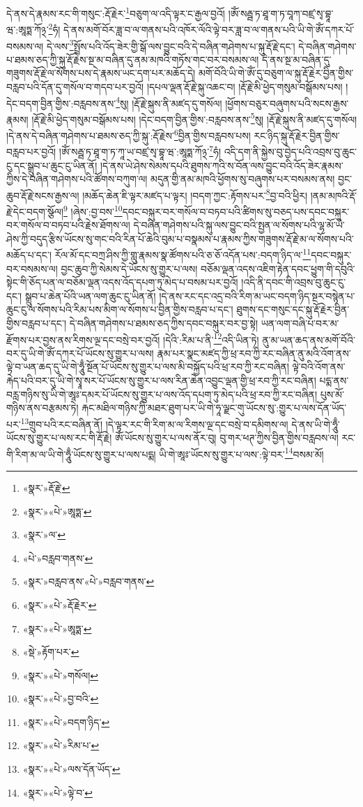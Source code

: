 དེ་ནས་དེ་རྣམས་རང་གི་གསུང་:རྡོ་རྗེར་\footnote{«སྣར་»རྡོ་རྗེ་}བཅུག་ལ་འདི་ལྟར་ང་རྒྱལ་བྱའོ། །ཨོཾ་སརྦྦ་ཏ་ཐཱ་ག་ཏ་བཱཀ་བཛྲ་སྭ་བྷཱ་ཝ་:ཨཱཏྨ་ཀོ྅་\footnote{«སྣར་»«པེ་»ཨཱཏྨ་}ཧཾ། དེ་ནས་མགོ་བོར་ཟླ་བ་ལ་གནས་པའི་འཁོར་ལོའི་ལྟེ་བར་ཟླ་བ་ལ་གནས་པའི་ཡི་གེ་ཨོཾ་དཀར་པོ་བསམས་ལ། དེ་ལས་\footnote{«སྣར་»ལ་}སྤྲོས་པའི་འོད་ཟེར་གྱི་སྒོ་ལས་བྱུང་བའི་དེ་བཞིན་གཤེགས་པ་སྐུ་རྡོ་རྗེ་དང་། དེ་བཞིན་གཤེགས་པ་ཐམས་ཅད་ཀྱི་སྐུ་རྡོ་རྗེས་སྔ་མ་བཞིན་དུ་ནམ་མཁའི་གཏོས་གང་བར་བསམས་ལ། དེ་ནས་སྔ་མ་བཞིན་དུ་གཟུགས་རྡོ་རྗེ་ལ་སོགས་པས་དེ་རྣམས་ཡང་དག་པར་མཆོད་དེ། མགོ་བོའི་ཡི་གེ་ཨོཾ་དུ་བཅུག་ལ་སྐུ་རྡོ་རྗེར་བྱིན་གྱིས་བརླབ་པའི་དོན་དུ་གསོལ་བ་གདབ་པར་བྱའོ། །དཔལ་ལྡན་རྡོ་རྗེ་སྐུ་འཆང་བ། །རྡོ་རྗེ་མི་ཕྱེད་གསུམ་བསྒོམས་པས། །དེང་བདག་བྱིན་གྱིས་:བརླབས་ནས་\footnote{«པེ་»བརླབ་གནས་}སུ། །རྡོ་རྗེ་སྐུས་ནི་མཛད་དུ་གསོལ། །ཕྱོགས་བཅུར་བཞུགས་པའི་སངས་རྒྱས་རྣམས། །རྡོ་རྗེ་མི་ཕྱེད་གསུམ་བསྒོམས་པས། །དེང་བདག་བྱིན་གྱིས་:བརླབས་ནས་\footnote{«སྣར་»བརླབ་ནས་«པེ་»བརླབ་གནས་}སུ། །རྡོ་རྗེ་སྐུས་ནི་མཛད་དུ་གསོལ། །དེ་ནས་དེ་བཞིན་གཤེགས་པ་ཐམས་ཅད་ཀྱི་སྐུ་:རྡོ་རྗེས་\footnote{«སྣར་»«པེ་»རྡོ་རྗེར་}བྱིན་གྱིས་བརླབས་པས། རང་ཉིད་སྐུ་རྡོ་རྗེར་བྱིན་གྱིས་བརླབ་པར་བྱའོ། །ཨོཾ་སརྦྦ་ཏ་ཐཱ་ག་ཏ་ཀཱ་ཡ་བཛྲ་སྭ་བྷཱ་ཝ་:ཨཱཏྨ་ཀོ྅་\footnote{«སྣར་»«པེ་»ཨཱཏྨ་}ཧཾ། འདི་དག་ནི་སྐྱེས་བུ་བྱེད་པའི་འབྲས་བུ་ཆུང་ངུ་དང་སྒྲུབ་པ་ཆུང་ངུ་ཡིན་ནོ། །དེ་ནས་ཡེ་ཤེས་སེམས་དཔའི་ཐུགས་ཀའི་ས་བོན་ལས་བྱུང་བའི་འོད་ཟེར་རྣམས་ཀྱིས་དེ་བཞིན་གཤེགས་པའི་ཚོགས་བཀུག་ལ། མདུན་གྱི་ནམ་མཁའི་ཕྱོགས་སུ་བཞུགས་པར་བསམས་ནས། བྱང་ཆུབ་རྡོ་རྗེ་སངས་རྒྱས་ལ། །མཆོད་ཆེན་ཇི་ལྟར་མཛད་པ་ལྟར། །བདག་ཀྱང་:རྟོགས་པར་\footnote{«སྡེ་»རྟོག་པར་}བྱ་བའི་ཕྱིར། །ནམ་མཁའི་རྡོ་རྗེ་དེང་བདག་སྩོལ།\footnote{«སྣར་»«པེ་»གསོལ།} །ཞེས་:བྱ་བས་\footnote{«སྣར་»«པེ་»བྱ་བའི་}དབང་བསྐུར་བར་གསོལ་བ་བཏབ་པའི་ཚིགས་སུ་བཅད་པས་དབང་བསྐུར་བར་གསོལ་བ་བཏབ་པའི་རྗེས་ཐོགས་ལ། དེ་བཞིན་གཤེགས་པའི་སྐུ་ལས་བྱུང་བའི་སྤྱན་ལ་སོགས་པའི་ལྷ་མོ་ཡེ་ཤེས་ཀྱི་བདུད་རྩིས་ཡོངས་སུ་གང་བའི་རིན་པོ་ཆེའི་བུམ་པ་བསྣམས་པ་རྣམས་ཀྱིས་གཟུགས་རྡོ་རྗེ་མ་ལ་སོགས་པའི་མཆོད་པ་དང་། རོལ་མོ་དང་བཀྲ་ཤིས་ཀྱི་གླུ་རྣམས་སྣ་ཚོགས་པའི་ཅ་ཅོ་འདོན་པས་:བདག་ཉིད་ལ་\footnote{«སྣར་»«པེ་»བདག་ཉིད་}དབང་བསྐུར་བར་བསམས་ལ། བྱང་ཆུབ་ཀྱི་སེམས་དེ་ཡོངས་སུ་གྱུར་པ་ལས། བཅོམ་ལྡན་འདས་འཇིག་རྟེན་དབང་ཕྱུག་གི་དབུའི་སྟེང་གི་ཅོད་པན་ལ་བཅོམ་ལྡན་འདས་འོད་དཔག་ཏུ་མེད་པ་བསམ་པར་བྱའོ། །འདི་ནི་དབང་གི་འབྲས་བུ་ཆུང་ངུ་དང་། སྒྲུབ་པ་ཆེན་པོའི་ཡན་ལག་ཆུང་ངུ་ཡིན་ནོ། །དེ་ནས་རང་དང་འདྲ་བའི་རིག་མ་ཡང་བདག་ཉིད་སྔར་བསྙེན་པ་ཆུང་ངུ་ལ་སོགས་པའི་རིམ་པས་མིག་ལ་སོགས་པ་བྱིན་གྱིས་བརླབ་པ་དང་། ཐུགས་དང་གསུང་དང་སྐུ་རྡོ་རྗེར་བྱིན་གྱིས་བརླབ་པ་དང་། དེ་བཞིན་གཤེགས་པ་ཐམས་ཅད་ཀྱིས་དབང་བསྐུར་བར་བྱ་སྟེ། ཡན་ལག་བཞི་པ་བར་མ་རྫོགས་པར་བྱས་ནས་རིགས་ལྔ་དང་བསྲེ་བར་བྱའོ། །དེའི་:རིམ་པ་ནི་\footnote{«སྣར་»«པེ་»རིམ་པ་}འདི་ཡིན་ཏེ། ནུ་མ་ཡན་ཆད་ནས་མགོ་བོའི་བར་དུ་ཡི་གེ་ཨོཾ་དཀར་པོ་ཡོངས་སུ་གྱུར་པ་ལས། རྣམ་པར་སྣང་མཛད་ཀྱི་ཕྲ་རབ་ཀྱི་རང་བཞིན་ནུ་མའི་འོག་ནས་ལྟེ་བ་ཡན་ཆད་དུ་ཡི་གེ་ཧཱུྃ་སྔོན་པོ་ཡོངས་སུ་གྱུར་པ་ལས་མི་བསྐྱོད་པའི་ཕྲ་རབ་ཀྱི་རང་བཞིན། ལྟེ་བའི་འོག་ནས་རྐེད་པའི་བར་དུ་ཡི་གེ་སྭཱ་སར་པོ་ཡོངས་སུ་གྱུར་པ་ལས་རིན་ཆེན་འབྱུང་ལྡན་གྱི་ཕྲ་རབ་ཀྱི་རང་བཞིན། པདྨ་ནས་བརླ་གཉིས་སུ་ཡི་གེ་ཨཱཿ་དམར་པོ་ཡོངས་སུ་གྱུར་པ་ལས་འོད་དཔག་ཏུ་མེད་པའི་ཕྲ་རབ་ཀྱི་རང་བཞིན། པུས་མོ་གཉིས་ནས་བརྩམས་ཏེ། རྐང་མཐིལ་གཉིས་ཀྱི་མཐར་ཐུག་པར་ཡི་གེ་ཧཱ་ལྗང་གུ་ཡོངས་སུ་:གྱུར་པ་ལས་དོན་ཡོད་པར་\footnote{«སྣར་»«པེ་»ལས་དོན་ཡོད་}གྲུབ་པའི་རང་བཞིན་ནོ། །དེ་ལྟར་རང་གི་རིག་མ་ལ་རིགས་ལྔ་དང་བསྲེ་བ་དམིགས་ལ། དེ་ནས་ཡི་གེ་ཧཱུྃ་ཡོངས་སུ་གྱུར་པ་ལས་རང་གི་རྡོ་རྗེ། ཨོཾ་ཡོངས་སུ་གྱུར་པ་ལས་ནོར་བུ། བུ་གར་ཕཊ་ཀྱིས་བྱིན་གྱིས་བརླབས་ལ། རང་གི་རིག་མ་ལ་ཡི་གེ་ཧཱུྃ་ཡོངས་སུ་གྱུར་པ་ལས་པདྨ། ཡི་གེ་ཨཱཿ་ཡོངས་སུ་གྱུར་པ་ལས་:ལྟེ་བར་\footnote{«སྣར་»«པེ་»ལྟེ་བ་}བསམ་མོ། 